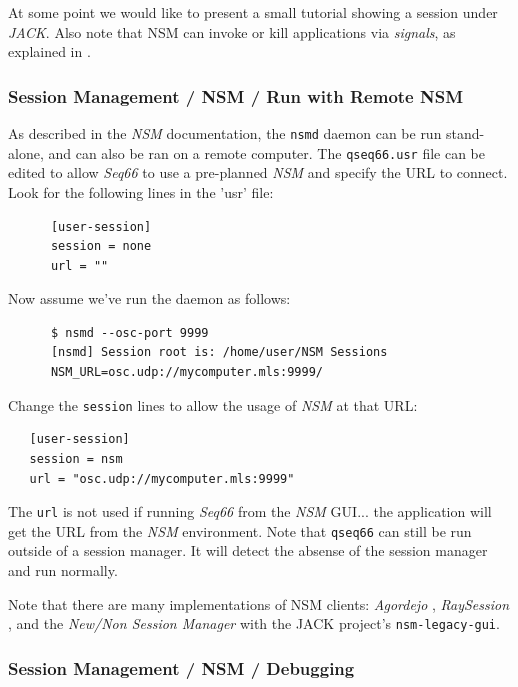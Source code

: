    At some point we would like to present a small tutorial showing a session
   under \textsl{JACK}.
   Also note that NSM can invoke or kill applications via
   \textsl{signals}, as explained in 
   .

\subsubsection{Session Management / NSM / Run with Remote NSM}
\label{subsec:sessions_nsm_before_using_nsm}

   As described in the \textsl{NSM} documentation, the \texttt{nsmd} daemon can
   be run stand-alone, and can also be ran on a remote computer.
   The \texttt{qseq66.usr} file can be edited to allow \textsl{Seq66} to
   use a pre-planned \textsl{NSM} and specify the URL to connect.
   Look for the following lines in the 'usr' file:

   \begin{verbatim}
      [user-session]
      session = none
      url = ""
   \end{verbatim}

   Now assume we've run the daemon as follows:

   \begin{verbatim}
      $ nsmd --osc-port 9999
      [nsmd] Session root is: /home/user/NSM Sessions
      NSM_URL=osc.udp://mycomputer.mls:9999/
   \end{verbatim}

   Change the \texttt{session} lines to allow the usage of
   \textsl{NSM} at that URL:

\begin{verbatim}
   [user-session]
   session = nsm
   url = "osc.udp://mycomputer.mls:9999"
\end{verbatim}

   The \texttt{url} is not used if running \textsl{Seq66} from the \textsl{NSM}
   GUI... the application will get the URL from the \textsl{NSM} environment.
   Note that \texttt{qseq66} can still be run outside of a
   session manager.  It will detect the absense of the session manager and run
   normally.

   Note that there are many implementations of NSM clients:
   \textsl{Agordejo} \cite{agordejo},
   \textsl{RaySession} \cite{raysession},
   and the
   \textsl{New/Non Session Manager} \cite{nsm}
   with the JACK project's \texttt{nsm-legacy-gui}.

\subsubsection{Session Management / NSM / Debugging}
\label{subsubsec:sessions_debugging}

